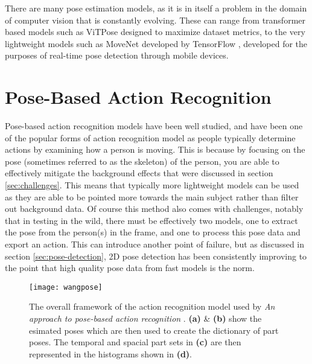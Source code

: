 There are many pose estimation models, as it is in itself a problem in the domain of computer vision that is constantly evolving. These can range from transformer based models such as ViTPose \cite{vitpose} designed to maximize dataset metrics, to the very lightweight models such as MoveNet developed by TensorFlow \cite{tensorflow2015-whitepaper}, developed for the purposes of real-time pose detection through mobile devices.

\section{Pose-Based Action Recognition}
\label{sec:pose-based}

Pose-based action recognition models have been well studied, and have been one of the popular forms of action recognition model as people typically determine actions by examining how a person is moving. This is because by focusing on the pose (sometimes referred to as the skeleton) of the person, you are able to effectively mitigate the background effects that were discussed in section \ref{sec:challenges}. This means that typically more lightweight models can be used as they are able to be pointed more towards the main subject rather than filter out background data. Of course this method also comes with challenges, notably that in testing in the wild, there must be effectively two models, one to extract the pose from the person(s) in the frame, and one to process this pose data and export an action. This can introduce another point of failure, but as discussed in section \ref{sec:pose-detection}, 2D pose detection has been consistently improving to the point that high quality pose data from fast models is the norm.

\begin{figure}[ht]
	\texttt{[image: wangpose]}
	\centering
	\caption{The overall framework of the action recognition model used by \textit{An approach to pose-based action recognition} \cite{WangPose}. \textbf{(a)} \& \textbf{(b)} show the esimated poses which are then used to create the dictionary of part poses. The temporal and spacial part sets in \textbf{(c)} are then represented in the histograms shown in \textbf{(d)}.}
	\label{fig:wangpose}
\end{figure}

